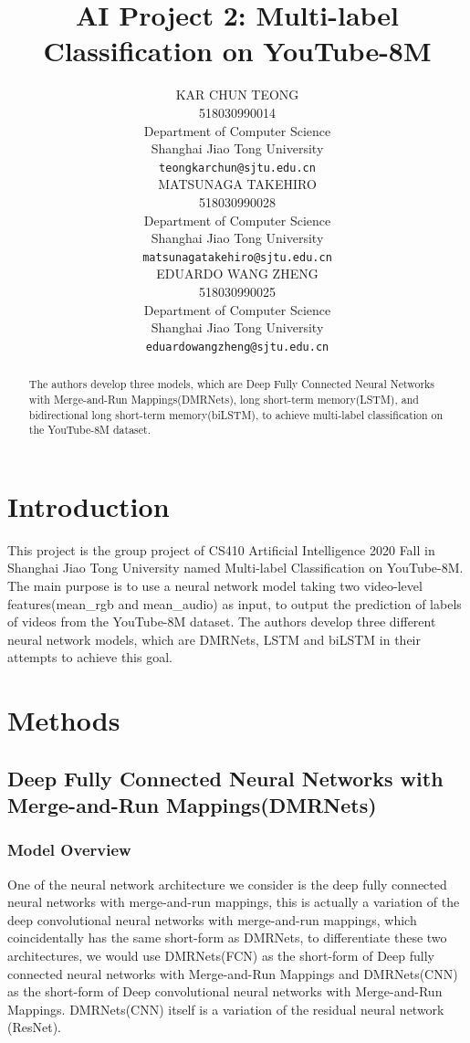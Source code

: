 \documentclass{article}
\title{AI Project 2: Multi-label Classification on YouTube-8M}
\author{
 KAR CHUN TEONG\\
518030990014\\
  Department of Computer Science\\
  Shanghai Jiao Tong University\\
  \texttt{teongkarchun@sjtu.edu.cn} \\
 \And
  MATSUNAGA TAKEHIRO \\
518030990028\\
	Department of Computer Science\\
  Shanghai Jiao Tong University\\
  \texttt{matsunagatakehiro@sjtu.edu.cn} \\
\And
  EDUARDO WANG ZHENG \\
	518030990025\\
	Department of Computer Science\\
  Shanghai Jiao Tong University\\
  \texttt{eduardowangzheng@sjtu.edu.cn} \\
}
\begin{document}
\maketitle

\begin{abstract}
  The authors develop three models, which are Deep Fully Connected Neural Networks with Merge-and-Run Mappings(DMRNets), long short-term memory(LSTM), and bidirectional long short-term memory(biLSTM), to achieve multi-label classification on the YouTube-8M dataset.
\end{abstract}

\section{Introduction}
This project is the group project of CS410 Artificial Intelligence 2020 Fall in Shanghai Jiao Tong University named Multi-label Classification on YouTube-8M. The main purpose is to use a neural network model taking two video-level features(mean\_rgb and mean\_audio) as input, to output the prediction of labels of videos from the YouTube-8M dataset. The authors develop three different neural network models, which are DMRNets, LSTM and biLSTM in their attempts to achieve this goal.

\section{Methods}
\subsection{Deep Fully Connected Neural Networks with Merge-and-Run Mappings(DMRNets)}
\subsubsection{Model Overview}
One of the neural network architecture we consider is the deep fully connected neural networks with merge-and-run mappings, this is actually a variation of the deep convolutional neural networks with merge-and-run mappings, which coincidentally has the same short-form as DMRNets, to differentiate these two architectures, we would use DMRNets(FCN) as the short-form of Deep fully connected neural networks with Merge-and-Run Mappings and DMRNets(CNN) as the short-form of Deep convolutional neural networks with Merge-and-Run Mappings. DMRNets(CNN) itself is a variation of the residual neural network (ResNet). 
\end{document}
